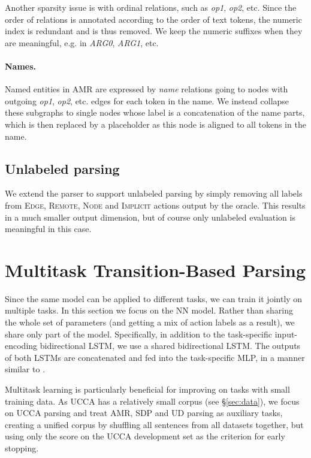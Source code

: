 \documentclass[11pt,a4paper]{article}
\begin{document}
Another sparsity issue is with ordinal relations, such as \textit{op1}, \textit{op2}, etc.
Since the order of relations is annotated according to the order of text tokens,
the numeric index is redundant and is thus removed.
We keep the numeric suffixes when they are meaningful, e.g. in \textit{ARG0}, \textit{ARG1}, etc.

\paragraph{Names.}
Named entities in AMR are expressed by \textit{name} relations going to nodes with outgoing
\textit{op1}, \textit{op2}, etc. edges for each token in the name.
We instead collapse these subgraphs to single nodes whose label is a concatenation of the
name parts, which is then replaced by a placeholder as this node is aligned to all tokens in the name.


\subsection{Unlabeled parsing}\label{sec:unlabeled}

We extend the parser to support unlabeled parsing by simply removing all labels from
\textsc{Edge}, \textsc{Remote}, \textsc{Node} and \textsc{Implicit} actions output by the oracle.
This results in a much smaller output dimension, but of course only unlabeled evaluation is
meaningful in this case.



\section{Multitask Transition-Based Parsing}\label{sec:multitask}

Since the same model can be applied to different tasks, we can train it jointly on multiple tasks.
In this section we focus on the NN model.
Rather than sharing the whole set of parameters (and getting a mix of action labels as a result),
we share only part of the model.
Specifically, in addition to the task-specific input-encoding bidirectional LSTM,
we use a shared bidirectional LSTM. The outputs of both LSTMs are concatenated and
fed into the task-specific MLP, in a manner similar to \citet{P17-1186}.

Multitask learning is particularly beneficial for improving on tasks with small training data.
As UCCA has a relatively small corpus (see \S\ref{sec:data}),
we focus on UCCA parsing and treat AMR, SDP and UD parsing
as auxiliary tasks, creating a unified corpus by shuffling all sentences from all datasets together,
but using only the score on the UCCA development set as the criterion for early stopping.
\end{document}
